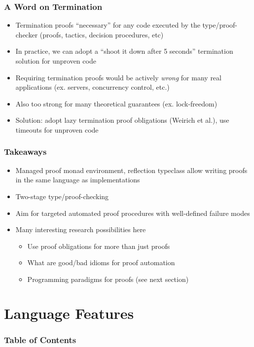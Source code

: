 \documentclass{beamer}
\begin{document}
\begin{frame}
  \frametitle{A Word on Termination}
  \begin{itemize}
    \item Termination proofs ``necessary'' for any code executed by
      the type/proof-checker (proofs, tactics, decision procedures, etc)
    \item In practice, we can adopt a ``shoot it down after 5
      seconds'' termination solution for unproven code
    \item Requiring termination proofs would be actively \emph{wrong}
      for many real applications (ex. servers, concurrency control, etc.)
    \item Also too strong for many theoretical guarantees (ex. lock-freedom)
    \item Solution: adopt lazy termination proof obligations (Weirich
      et al.), use timeouts for unproven code
  \end{itemize}
\end{frame}

\begin{frame}
  \frametitle{Takeaways}
  \begin{itemize}
    \item Managed proof monad environment, reflection typeclass allow
      writing proofs in the same language as implementations
    \item Two-stage type/proof-checking
    \item Aim for targeted automated proof procedures with
      well-defined failure modes
    \item Many interesting research possibilities here
      \begin{itemize}
        \item Use proof obligations for more than just proofs
        \item What are good/bad idioms for proof automation
        \item Programming paradigms for proofs (see next section)
      \end{itemize}
  \end{itemize}
\end{frame}

\section{Language Features}

\begin{frame}
  \frametitle{Table of Contents}
  \tableofcontents[currentsection]
\end{frame}
\end{document}

